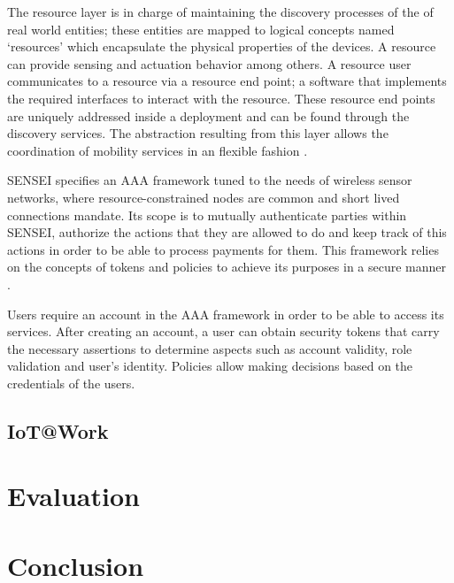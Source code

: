 \documentclass[journal]{IEEEtran}
\begin{document}
  The resource layer is in charge of maintaining the discovery processes of the of real world entities; these entities are mapped to logical concepts named `resources' which encapsulate the physical properties of the devices. A resource can provide sensing and actuation behavior among others. A resource user communicates to a resource via a resource end point; a software that implements the required interfaces to interact with the resource. These resource end points are uniquely addressed inside a deployment and can be found through the discovery services. The abstraction resulting from this layer allows the coordination of mobility services in an flexible fashion \cite{Tsiatsis2010}. 
  
  SENSEI specifies an AAA framework tuned to the needs of wireless sensor networks, where resource-constrained nodes are common and short lived connections mandate. Its scope is to mutually authenticate parties within SENSEI, authorize the actions that they are allowed to do and keep track of this actions in order to be able to process payments for them. This framework relies on the concepts of tokens and policies to achieve its purposes in a secure manner \cite{Bauge2010}.

  Users require an account in the AAA framework in order to be able to access its services. After creating an account, a user can obtain security tokens that carry the necessary assertions to determine aspects such as account validity, role validation and user's identity. Policies allow making decisions based on the credentials of the users.


  \subsection{IoT@Work}

\section{Evaluation}

\section{Conclusion}



\end{document}
